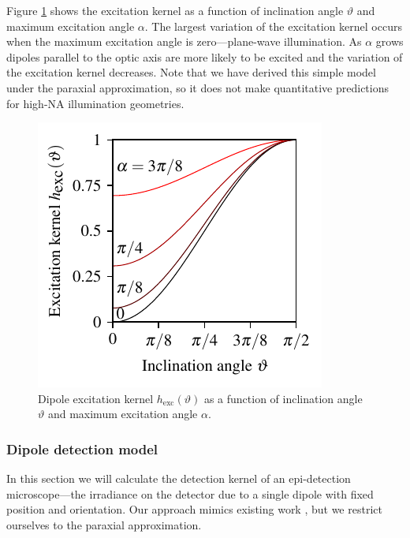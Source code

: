 \documentclass{osa-article}
\begin{document}
Figure \ref{fig:excitation} shows the excitation kernel as a function of
inclination angle $\vartheta$ and maximum excitation angle $\alpha$. The largest
variation of the excitation kernel occurs when the maximum excitation angle is
zero---plane-wave illumination. As $\alpha$ grows dipoles parallel to the optic
axis are more likely to be excited and the variation of the excitation kernel
decreases. Note that we have derived this simple model under the paraxial
approximation, so it does not make quantitative predictions for high-NA
illumination geometries.
\begin{figure}[h]
 \centering
   \centering
   \includegraphics[scale=0.95]{../figures/excitation/excitation.pdf}
   \caption{Dipole excitation kernel $h_{\text{exc}}(\vartheta)$ as a function of
     inclination angle $\vartheta$ and maximum excitation angle $\alpha$.}
   \label{fig:excitation}
 \end{figure}

 \subsubsection{Dipole detection model}
 In this section we will calculate the detection kernel of an epi-detection
 microscope---the irradiance on the detector due to a single dipole with fixed
 position and orientation. Our approach mimics existing work \cite{backer2014,
   nov2006, agrawal2012}, but we restrict ourselves to the paraxial
 approximation.
\end{document}
